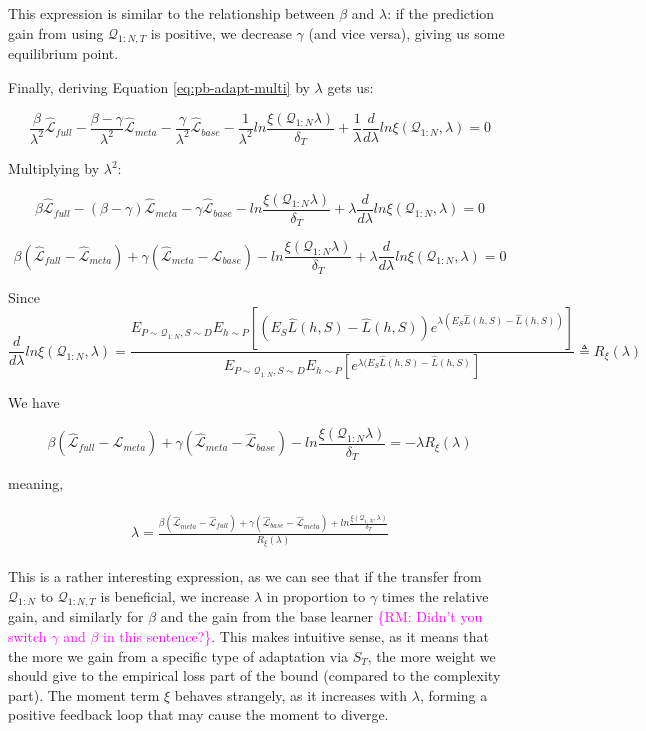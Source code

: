 \documentclass[letterpaper]{article}
\theoremstyle{definition}
\newcommand{\RM}[1]{\textcolor{magenta}{\{RM: #1\}}}
\begin{document}
This expression is similar to the relationship between $\beta$ and $\lambda$: if the prediction gain from using $\mathcal{Q}_{1:N,T}$ is positive, we decrease $\gamma$ (and vice versa), giving us some equilibrium point.

Finally, deriving Equation \ref{eq:pb-adapt-multi} by $\lambda$ gets us:

$$\frac{\beta}{\lambda^2} \hat{\mathcal{L}}_{full}-\frac{\beta-\gamma}{\lambda^2}\hat{\mathcal{L}}_{meta}-\frac{\gamma}{\lambda^2}\hat{\mathcal{L}}_{base}-\frac{1}{\lambda^2}ln\frac{\xi(\mathcal{Q}_{1:N}\lambda)}{\delta_T}+\frac{1}{\lambda}\frac{d}{d\lambda}ln\xi(\mathcal{Q}_{1:N},\lambda)=0$$

Multiplying by $\lambda^2$:

$$\beta \hat{\mathcal{L}}_{full}-(\beta-\gamma)\hat{\mathcal{L}}_{meta}-\gamma\hat{\mathcal{L}}_{base}-ln\frac{\xi(\mathcal{Q}_{1:N}\lambda)}{\delta_T}+\lambda\frac{d}{d\lambda}ln\xi(\mathcal{Q}_{1:N},\lambda)=0$$

$$\beta(\hat{\mathcal{L}}_{full}-\hat{\mathcal{L}}_{meta})+\gamma(\hat{\mathcal{L}}_{meta}-\hat{\mathcal{L}}_{base})-ln\frac{\xi(\mathcal{Q}_{1:N}\lambda)}{\delta_T}+\lambda\frac{d}{d\lambda}ln\xi(\mathcal{Q}_{1:N},\lambda)=0$$

Since $$\frac{d}{d\lambda}ln\xi(\mathcal{Q}_{1:N},\lambda)=\frac{E_{P\sim \mathcal{Q}_{1:N},S\sim D}E_{h\sim P}\left [(E_S\hat{L}(h, S)-\hat{L}(h, S))e^{\lambda(E_S\hat{L}(h, S)-\hat{L}(h, S))} \right ]}{E_{P\sim \mathcal{Q}_{1:N},S\sim D}E_{h\sim P}\left [e^{\lambda(E_S\hat{L}(h, S)-\hat{L}(h, S)} \right ]}\triangleq R_\xi(\lambda)$$

We have

$$\beta(\hat{\mathcal{L}}_{full}-\hat{\mathcal{L}}_{meta})+\gamma(\hat{\mathcal{L}}_{meta}-\hat{\mathcal{L}}_{base})-ln\frac{\xi(\mathcal{Q}_{1:N}\lambda)}{\delta_T}=-\lambda R_\xi(\lambda)$$

meaning,

\begin{align} 
\begin{split}
\lambda = \frac{\beta(\hat{\mathcal{L}}_{meta}-\hat{\mathcal{L}}_{full})+\gamma(\hat{\mathcal{L}}_{base}-\hat{\mathcal{L}}_{meta})+ln\frac{\xi(\mathcal{Q}_{1:N},\lambda)}{\delta_T}}{R_\xi(\lambda)}
\end{split}
\end{align}

This is a rather interesting expression, as we can see that if the transfer from $\mathcal{Q}_{1:N}$ to $\mathcal{Q}_{1:N,T}$ is beneficial, we increase $\lambda$ in proportion to $\gamma$ times the relative gain, and similarly for $\beta$ and the gain from the base learner \RM{Didn't you switch $\gamma$ and $\beta$ in this sentence?}. This makes intuitive sense, as it means that the more we gain from a specific type of adaptation via $S_T$, the more weight we should give to the empirical loss part of the bound (compared to the complexity part). The moment term $\xi$ behaves strangely, as it increases with $\lambda$, forming a positive feedback loop that may cause the moment to diverge. 
\end{document}

